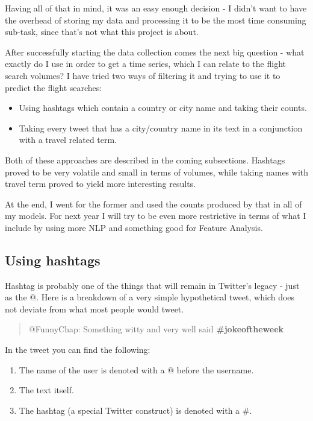 \documentclass[minf,frontabs,twoside,singlespacing,parskip]{infthesis}
\begin{document}
Having all of that in mind, it was an easy enough decision - I didn't want to have the overhead of storing my data and processing it to be the most time consuming sub-task, since that's not what this project is about. 

After successfully starting the data collection comes the next big question - what exactly do I use in order to get a time series, which I can relate to the flight search volumes? I have tried two ways of filtering it and trying to use it to predict the flight searches:
\begin{itemize}
\item Using hashtags which contain a country or city name and taking their counts.
\item Taking every tweet that has a city/country name in its text in a conjunction with a travel related term.\end{itemize}

Both of these approaches are described in the coming subsections. Hashtags proved to be very volatile and small in terms of volumes, while taking names with travel term proved to yield more interesting results.  

At the end, I went for the former and used the counts produced by that in all of my models. For next year I will try to be even more restrictive in terms of what I include by using more NLP and something good for Feature Analysis. 

\subsection{Using hashtags}
\label{sec:hashtag}

Hashtag is probably one of the things that will remain in Twitter's legacy - just as the @. Here is a breakdown of a very simple hypothetical tweet, which does not deviate from what most people would tweet.

\begin{quotation}
@FunnyChap: Something witty and very well said \bf{\#jokeoftheweek}
\end{quotation}

In the tweet you can find the following: 
\begin{enumerate}
\item The name of the user is denoted with a @ before the username.
\item The text itself.
\item The hashtag (a special Twitter construct) is denoted with a \#.
\end{enumerate}
\end{document}
